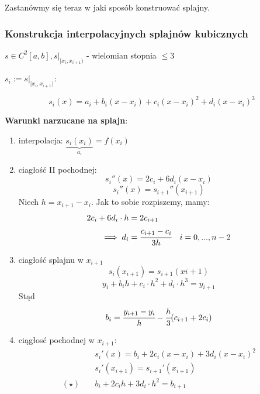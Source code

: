 \documentclass[hidelinks,a4paper,fleqn,oneside]{book}
\begin{document}
Zastanówmy się teraz w jaki sposób konstruować splajny.
\subsubsection{Konstrukcja interpolacyjnych splajnów kubicznych}

$s \in C^2[a, b], s|_{[x_i, x_{i+1})}$ - wielomian stopnia $\leq 3$


$s_i := s|_{[x_i, x_{i+1})}$: 

\[
	s_i(x) = a_i + b_i(x-x_i) + c_i(x-x_i)^2 + d_i(x-x_i)^3
\]

\textbf{Warunki narzucane na splajn}:
\begin{enumerate}
	\item interpolacja: $\underbrace{s_i(x_i)}_{a_i} = f(x_i)$ 
	\item ciagłość II pochodnej:
		\[
			s_i''(x) = 2c_i + 6d_i(x-x_i)
		\]
		\[
			s_i''(x) = s_{i+1}''(x_{i+1})
		\]
		Niech $h = x_{i+1}-x_i$. Jak to sobie rozpiszemy, mamy:
		\begin{align*}
			2c_i + 6d_i \cdot h & = 2c_{i+1} \\
			\implies d_i &= \cfrac{c_{i+1}-c_i}{3h} \quad i=0, ..., n-2
		\end{align*}
		\item ciagłość splajnu w $x_{i+1}$
		\[
			s_i(x_{i+1}) = s_{i+1}(x{i+1})
		\]
		\[
			y_i + b_ih + c_i \cdot h^2 + d_i\cdot h^3 = y_{i+1}
		\]
		Stąd
		\[
			b_i = \cfrac{y_{i+1}-y_i}{h} - \cfrac{h}{3}(c_{i+1} + 2c_i)
		\]
		\item ciągłosć pochodnej w $x_{i+1}$:
		\begin{align*}
			& s_i'(x) = b_i + 2c_i(x-x_i) + 3d_i(x-x_i)^2 \\
			& s_i'(x_{i+1}) = s_{i+1}'(x_{i+1}) \\ 
			(\star) \quad & b_i + 2c_ih + 3d_i\cdot h^2 = b_{i+1}
		\end{align*}
\end{enumerate}
\end{document}
